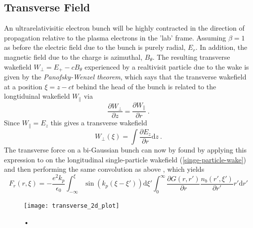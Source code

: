 \subsection{Transverse Field} 
An ultrarelativisitic electron bunch will be highly contracted in the direction of propagation relative to the plasma electrons in the 'lab' frame. Assuming $\beta=1$ as before the electric field due to the bunch is purely radial, $E_r$. In addition, the magnetic field due to the charge is azimuthal, $B_{\theta}$. The resulting transverse wakefield $W_{\perp}=E_+-cB_{\theta}$ experienced by a realtivisit particle due to the wake is given by the \textit{Panofsky-Wenzel theorem}\cite{Vaganian1995}, which says that the transverse wakefield at a position $\xi=z-ct$ behind the head of the bunch is related to the longtiduinal wakefield $W_{\parallel}$ via
\begin{equation}
\frac{\partial W_{\perp} }{\partial z}=\frac{\partial W_{\parallel} }{\partial r}~.
\end{equation} 
Since $W_{\parallel} =E_z$ this gives a transverse wakefield
\begin{equation}
W_{\perp}(\xi)=\int \frac{\partial E_z }{\partial r}\mathrm{d}z~.
\end{equation}
The transverse force on a bi-Gaussian bunch can now by found by applying this expression to on the longitudinal single-particle wakefield (\ref{singe-particle-wake}) and then performing the same convolution as above \cite{Katsouleas1987, Mira2017}, which yields 
\begin{equation}
F_r(r,\xi)=-\frac{e^2 k_p}{\epsilon_0} \int_{-\infty}^{\xi} \sin(k_p(\xi-\xi'))\mathrm{d}\xi' \int_{0}^{\infty}\frac{\partial G\left(r,r'\right)}{\partial r} \frac{n_b(r',\xi')}{\partial r'}
r'\mathrm{d}r'
\end{equation}
\begin{figure}
\centering
\texttt{[image: transverse\_2d\_plot]}
\label{transverse_plot}
\caption{•}
\end{figure}

